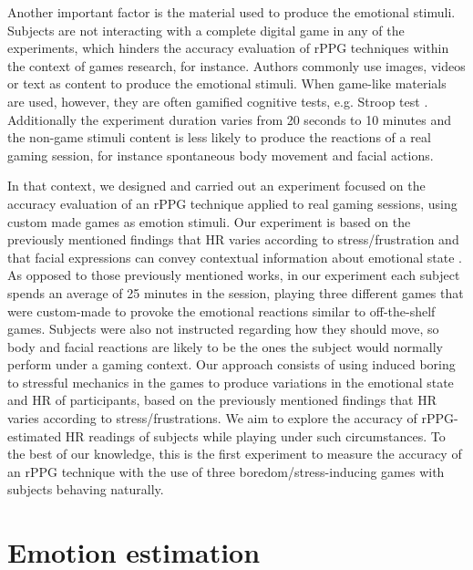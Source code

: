 Another important factor is the material used to produce the emotional stimuli. Subjects are not interacting with a complete digital game in any of the experiments, which hinders the accuracy evaluation of rPPG techniques within the context of games research, for instance. Authors commonly use images, videos or text as content to produce the emotional stimuli. When game-like materials are used, however, they are often gamified cognitive tests, e.g. Stroop test \parencite{golden1978stroop}. Additionally the experiment duration varies from 20 seconds to 10 minutes and the non-game stimuli content is less likely to produce the reactions of a real gaming session, for instance spontaneous body movement and facial actions.

In that context, we designed and carried out an experiment focused on the accuracy evaluation of an rPPG technique applied to real gaming sessions, using custom made games as emotion stimuli. Our experiment is based on the previously mentioned findings that HR varies according to stress/frustration and that facial expressions can convey contextual information about emotional state \parencite{giannakakis2017stress}. As opposed to those previously mentioned works, in our experiment each subject spends an average of 25 minutes in the session, playing three different games that were custom-made to provoke the emotional reactions similar to off-the-shelf games. Subjects were also not instructed regarding how they should move, so body and facial reactions are likely to be the ones the subject would normally perform under a gaming context. Our approach consists of using induced boring to stressful mechanics in the games to produce variations in the emotional state and HR of participants, based on the previously mentioned findings that HR varies according to stress/frustrations. We aim to explore the accuracy of rPPG-estimated HR readings of subjects while playing under such circumstances. To the best of our knowledge, this is the first experiment to measure the accuracy of an rPPG technique with the use of three boredom/stress-inducing games with subjects behaving naturally.

\section{Emotion estimation}


